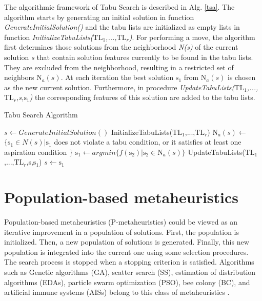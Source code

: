 The algorithmic framework of Tabu Search is described in Alg. \ref{tsa}.  The algorithm starts by generating an initial solution in function \textit{GenerateInitialSolution()} and the tabu lists are initialized as empty lists in function \textit{InitializeTabuLists($\mbox{TL}_1$,...,$\mbox{TL}_r$)}. For performing a move, the algorithm first determines those solutions from the neighborhood \textit{N(s)} of the current solution \textit{s} that contain solution features currently to be found in the tabu lists. They are excluded from the neighborhood, resulting in a restricted set of neighbors \textit{$\mbox{N}_a(s)$}. At each iteration the best solution \textit{$\mbox{s}_1$} from \textit{$\mbox{N}_a(s)$} is chosen as the new current solution. Furthermore, in procedure \textit{UpdateTabuLists($\mbox{TL}_1$,...,$\mbox{TL}_r$,s,$\mbox{s}_1$)} the corresponding features of this solution are added to the tabu lists.


\begin{algorithm}[h]
  \caption{Tabu Search Algorithm}\label{tsa}
  \begin{algorithmic}[2]
    
    \State $s\gets GenerateInitialSolution()$
    \State InitializeTabuLists($\mbox{TL}_1$,...,$\mbox{TL}_r$)
    \State $\mbox{N}_a(s)\gets$ $\{\mbox{s}_1 \in N(s) |\mbox{s}_1$ does not violate a tabu condition, or it satisfies at least one aspiration condition $\}$ 
    \State $\mbox{s}_1\gets argmin\{f(\mbox{s}_2)|\mbox{s}_2 \in \mbox{N}_a(s) \}$
    \State UpdateTabuLists($\mbox{TL}_1$,...,$\mbox{TL}_r$,s,$\mbox{s}_1$)
    \State $s\gets \mbox{s}_1$
    \EndWhile
      
  \end{algorithmic}
\end{algorithm}

\section{Population-based metaheuristics}

Population-based metaheuristics (P-metaheuristics) could be viewed as an iterative improvement in a population of solutions. First, the population is initialized. Then, a new population of solutions is generated. Finally, this new population is integrated into the current one using some selection procedures. The search process is stopped when a stopping criterion is satisfied. Algorithms such as Genetic algorithms (GA), scatter search (SS), estimation of distribution algorithms (EDAs), particle swarm optimization (PSO), bee colony (BC), and artificial immune systems (AISs) belong to this class of metaheuristics \cite{talbi2009metaheuristics}. 

